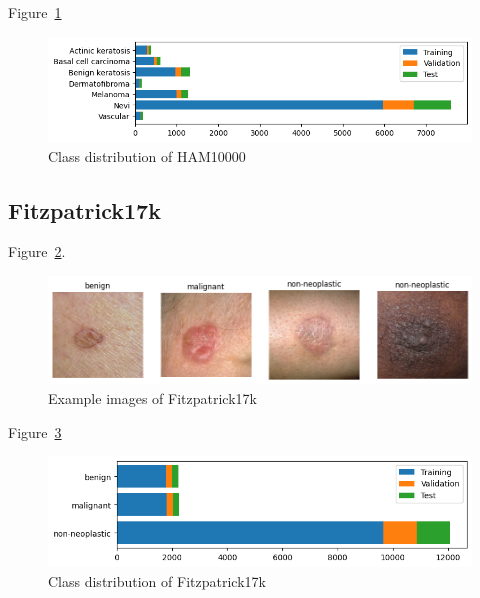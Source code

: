 Figure~\ref{fig:class_distribution_of_ham10000}

\begin{figure}[H]
    \begin{center}
    \includegraphics[width=15cm]{../images/class_distribution_of_ham10000.png}
    \caption{Class distribution of HAM10000}\label{fig:class_distribution_of_ham10000}
    \end{center}
\end{figure}
\subsection{Fitzpatrick17k}
Figure~\ref{fig:example_images_of_fitzpatrick17k}.

\begin{figure}[H]
    \begin{center}
    \includegraphics[width=15cm]{../images/example_images_of_fitzpatrick17k.png}
    \caption{Example images of Fitzpatrick17k}\label{fig:example_images_of_fitzpatrick17k}
    \end{center}
\end{figure}

Figure~\ref{fig:class_distribution_of_fitzpatrick17k}

\begin{figure}[H]
    \begin{center}
    \includegraphics[width=15cm]{../images/class_distribution_of_fitzpatrick17k.png}
    \caption{Class distribution of Fitzpatrick17k}\label{fig:class_distribution_of_fitzpatrick17k}
    \end{center}
\end{figure}
